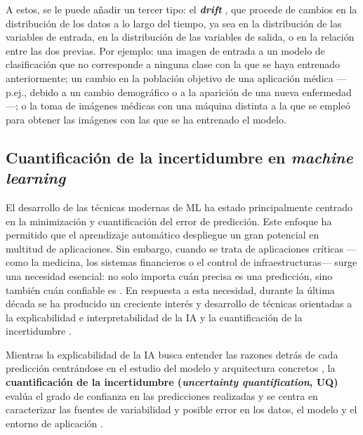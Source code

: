 A estos, se le puede añadir un tercer tipo: el \textbf{\textit{drift}} \cite{gama2012, nemani2023}, que 
procede de cambios en la distribución de los datos a lo largo del tiempo, ya sea en la distribución de las 
variables de entrada, en la distribución de las variables de salida, o en la relación entre las dos previas. 
Por ejemplo: una imagen de entrada a un modelo de clasificación que no corresponde a ninguna clase con la que 
se haya entrenado anteriormente; un cambio en la población objetivo de una aplicación médica ---p.ej., debido 
a un cambio demográfico o a la aparición de una nueva enfermedad---; o la toma de imágenes médicas con una 
máquina distinta a la que se empleó para obtener las imágenes con las que se ha entrenado el modelo.


\subsection{Cuantificación de la incertidumbre en \textit{machine learning}} 

El desarrollo de las técnicas modernas de ML ha estado principalmente centrado en la minimización y 
cuantificación del error de predicción. Este enfoque ha permitido que el aprendizaje automático despliegue un 
gran potencial en multitud de aplicaciones.
Sin embargo, cuando se trata de aplicaciones críticas ---como la medicina, los sistemas financieros o el 
control de infraestructuras--- surge una necesidad esencial: no solo importa cuán precisa es una predicción, 
sino también cuán confiable es \cite{begoli2019}. 
En respuesta a esta necesidad, durante la última década se ha producido un creciente interés y desarrollo de 
técnicas orientadas a la explicabilidad e interpretabilidad de la IA 
\cite{angelov2021, ali2023, miller2019, loh2022} y la cuantificación de la incertidumbre
\cite{abdar2021, psaros2023, nemani2023}.

Mientras la explicabilidad de la IA busca entender las razones detrás de cada predicción centrándose en el 
estudio del modelo y arquitectura concretos \cite{salvi2025}, la 
\textbf{cuantificación de la incertidumbre (\textit{uncertainty quantification}, UQ)} evalúa el grado de 
confianza en las predicciones realizadas y se centra en caracterizar las fuentes de variabilidad y posible 
error en los datos, el modelo y el entorno de aplicación \cite{nemani2023}.

